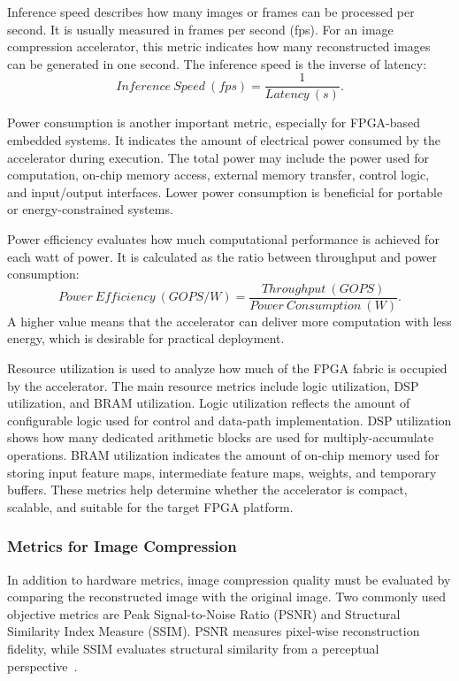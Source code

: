 Inference speed describes how many images or frames can be processed per second. It is usually measured in frames per second (fps). For an image compression accelerator, this metric indicates how many reconstructed images can be generated in one second. The inference speed is the inverse of latency:
\begin{equation}
Inference~Speed~(fps) = \frac{1}{Latency~(s)}.
\end{equation}

Power consumption is another important metric, especially for FPGA-based embedded systems. It indicates the amount of electrical power consumed by the accelerator during execution. The total power may include the power used for computation, on-chip memory access, external memory transfer, control logic, and input/output interfaces. Lower power consumption is beneficial for portable or energy-constrained systems.

Power efficiency evaluates how much computational performance is achieved for each watt of power. It is calculated as the ratio between throughput and power consumption:
\begin{equation}
Power~Efficiency~(GOPS/W) = \frac{Throughput~(GOPS)}{Power~Consumption~(W)}.
\end{equation}
A higher value means that the accelerator can deliver more computation with less energy, which is desirable for practical deployment.

Resource utilization is used to analyze how much of the FPGA fabric is occupied by the accelerator. The main resource metrics include logic utilization, DSP utilization, and BRAM utilization. Logic utilization reflects the amount of configurable logic used for control and data-path implementation. DSP utilization shows how many dedicated arithmetic blocks are used for multiply-accumulate operations. BRAM utilization indicates the amount of on-chip memory used for storing input feature maps, intermediate feature maps, weights, and temporary buffers. These metrics help determine whether the accelerator is compact, scalable, and suitable for the target FPGA platform.

\subsubsection{Metrics for Image Compression}

In addition to hardware metrics, image compression quality must be evaluated by comparing the reconstructed image with the original image. Two commonly used objective metrics are Peak Signal-to-Noise Ratio (PSNR) and Structural Similarity Index Measure (SSIM). PSNR measures pixel-wise reconstruction fidelity, while SSIM evaluates structural similarity from a perceptual perspective~\cite{huynh2008scope,wang2004ssim}.

